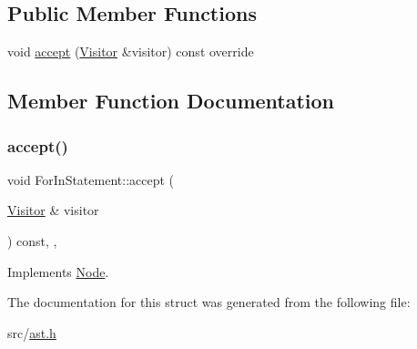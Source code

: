 \subsection*{Public Member Functions}
\begin{DoxyCompactItemize}
\item 
void \hyperlink{struct_for_in_statement_ab5ee623aba6eebd12e52a9196e33e64b}{accept} (\hyperlink{struct_visitor}{Visitor} \&visitor) const override
\end{DoxyCompactItemize}


\subsection{Member Function Documentation}
\mbox{\label{struct_for_in_statement_ab5ee623aba6eebd12e52a9196e33e64b}} 
\subsubsection{\texorpdfstring{accept()}{accept()}}
{\footnotesize\ttfamily void For\+In\+Statement\+::accept (\begin{DoxyParamCaption}\item[{\hyperlink{struct_visitor}{Visitor} \&}]{visitor }\end{DoxyParamCaption}) const\hspace{0.3cm}{\ttfamily [inline]}, {\ttfamily [override]}, {\ttfamily [virtual]}}



Implements \hyperlink{struct_node_a10bd7af968140bbf5fa461298a969c71}{Node}.



The documentation for this struct was generated from the following file\+:\begin{DoxyCompactItemize}
\item 
src/\hyperlink{ast_8h}{ast.\+h}\end{DoxyCompactItemize}
